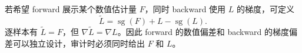 若希望 forward 展示某个数值估计量 $F$，同时 backward 使用 $L$ 的梯度，可定义
\[
 \widetilde L=\operatorname{sg}(F)+L-\operatorname{sg}(L).
\]
逐样本有 $\widetilde L=F$，但 $\nabla\widetilde L=\nabla L$。因此 forward 的数值偏差和 backward 的梯度偏差可以独立设计，审计时必须同时给出 $F$ 和 $L$。




